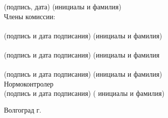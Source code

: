 \begin{titlepage}
\begin{flushleft}
            \vspace{-0.2cm}\hspace{8cm}\footnotesize(подпись, дата)
            \hspace{3cm}(инициалы и фамилия)\normalsize\\
            \vspace{1cm}
        Члены комиссии:\\
        \hspace{0.2cm}\underline{\hspace{5cm}}\hspace{0.5cm}\underline{\hspace{6cm}}\\
            \vspace{-0.2cm}\hspace{0.5cm}\footnotesize(подпись и дата подписания)\hspace{2cm}
            (инициалы и фамилия)\\
        \hspace{0.2cm}\underline{\hspace{5cm}}\hspace{0.5cm}\underline{\hspace{6cm}}\\
            \vspace{-0.2cm}\hspace{0.5cm}\footnotesize(подпись и дата подписания)\hspace{2cm}
            (инициалы и фамилия\\
        \hspace{0.2cm}\underline{\hspace{5cm}}\hspace{0.5cm}\underline{\hspace{6cm}}\\
            \vspace{-0.2cm}\hspace{0.5cm}\footnotesize(подпись и дата подписания)\hspace{2cm}
            (инициалы и фамилия)\\
        \vspace{2cm}
        Нормоконтролер \underline{\hspace{5cm}}\hspace{0.5cm}\underline{\hspace{7cm}}\\
            \vspace{-0.2cm}\hspace{4.2cm}\footnotesize(подпись и дата подписания)\hspace{2cm}
        (   инициалы и фамилия)\normalsize\\
    \end{flushleft}
    \vspace{\fill}
    \begin{center}
        Волгоград \the\year г.
    \end{center}
\end{titlepage}
